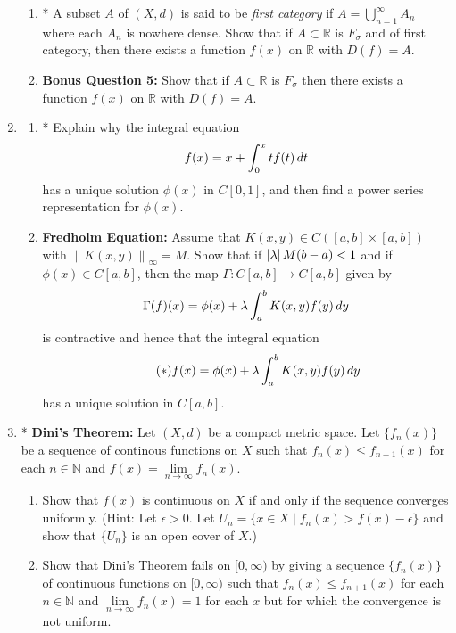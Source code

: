 \documentclass[notoc,notitlepage]{tufte-book}
\newcommand{\norm}[1]{\left\| #1 \right\|}
\begin{document}
\begin{enumerate}
\begin{enumerate}
      \item * A subset $A$ of $(X, d)$ is said to be \textit{first category} if $A = \bigcup_{n = 1}^{\infty} A_n$ where each $A_n$ is nowhere dense. Show that if $A \subset \mathbb{R}$ is $F_\sigma$ and of first category, then there exists a function $f(x)$ on $\mathbb{R}$ with $D(f) = A$.

      \item \textbf{Bonus Question 5:} Show that if $A \subset \mathbb{R}$ is $F_\sigma$ then there exists a function $f(x)$ on $\mathbb{R}$ with $D(f) = A$.
    \end{enumerate}

  \item \begin{enumerate}
      \item * Explain why the integral equation
        \begin{equation*}
          f(x) = x + \int_{0}^{x} tf(t) \mathop{}\!d{t}
        \end{equation*}
        has a unique solution $\phi(x)$ in $C[0, 1]$, and then find a power series representation for $\phi(x)$.
      \item \textbf{Fredholm Equation:} Assume that $K(x, y) \in C( [a, b] \times [a, b] )$ with $\norm{ K(x, y) }_\infty = M$. Show that if $\left| \lambda \right| M( b - a ) < 1$ and if $\phi(x) \in C[ a, b ]$, then the map $\Gamma : C[a, b] \to C[a, b]$ given by
        \begin{equation*}
          \Gamma(f)(x) = \phi(x) + \lambda \int_{a}^{b} K(x, y) f(y) \mathop{}\!d{y}
        \end{equation*}
        is contractive and hence that the integral equation
        \begin{equation*}\tag{$*$}\label{eq:fredholm}
          f(x) = \phi(x) + \lambda \int_{a}^{b} K(x, y) f(y) \mathop{}\!d{y}
        \end{equation*}
        has a unique solution in $C[a, b]$.
    \end{enumerate}

  \item * \textbf{Dini's Theorem:} Let $(X, d)$ be a compact metric space. Let $\{ f_n(x) \}$ be a sequence of continous functions on $X$ such that $f_n(x) \leq f_{n + 1}(x)$ for each $n \in \mathbb{N}$ and $f(x) = \lim\limits_{n \to \infty} f_n(x)$.
    \begin{enumerate}
      \item Show that $f(x)$ is continuous on $X$ if and only if the sequence converges uniformly. (Hint: Let $\epsilon > 0$. Let $U_n = \{ x \in X \mid f_n(x) > f(x) - \epsilon \}$ and show that $\{ U_n \}$ is an open cover of $X$.)
      \item Show that Dini's Theorem fails on $[0 ,\infty)$ by giving a sequence $\{ f_n(x) \}$ of continuous functions on $[0, \infty)$ such that $f_n(x) \leq f_{n + 1}(x)$ for each $n \in \mathbb{N}$ and $\lim\limits_{n \to \infty} f_n(x) = 1$ for each $x$ but for which the convergence is not uniform.
    \end{enumerate}


\end{enumerate}
\end{document}
